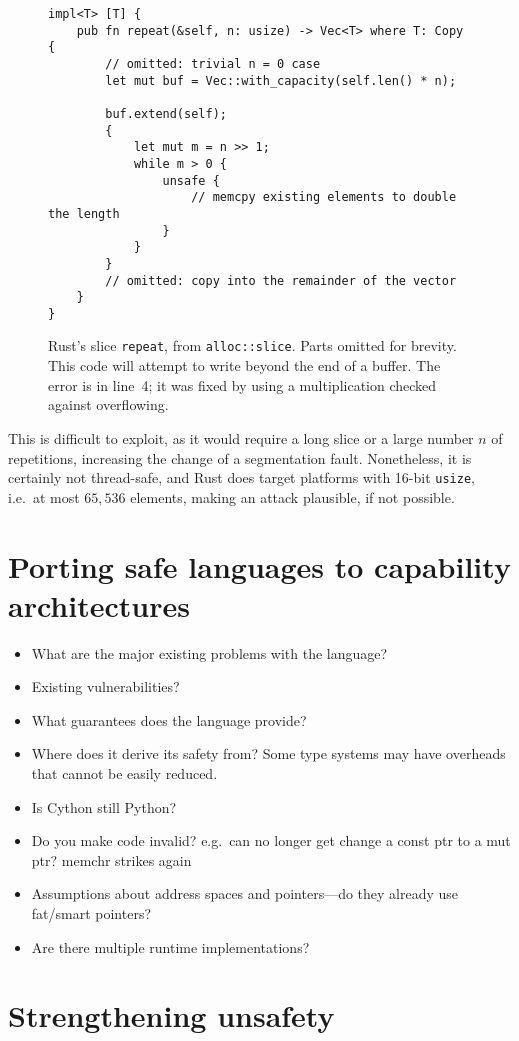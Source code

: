 \documentclass[dissertation.tex]{subfiles}
\begin{document}
\begin{figure}[ht]
\begin{lstlisting}
impl<T> [T] {
    pub fn repeat(&self, n: usize) -> Vec<T> where T: Copy {
        // omitted: trivial n = 0 case
        let mut buf = Vec::with_capacity(self.len() * n);

        buf.extend(self);
        {
            let mut m = n >> 1;
            while m > 0 {
                unsafe {
                    // memcpy existing elements to double the length
                }
            }
        }
        // omitted: copy into the remainder of the vector
    }
}
\end{lstlisting}
\caption{ Rust's slice \texttt{repeat}, from
\texttt{alloc::slice}. Parts omitted for brevity. This code will attempt
to write beyond the end of a buffer.
The error is in line~4; it was fixed by using a multiplication checked
against overflowing.}
\label{lst:slice-repeat}
\end{figure}


This is difficult to exploit, as it would require a long slice or a
large number \(n\) of repetitions, increasing the change of a
segmentation fault.
Nonetheless, it is certainly not thread-safe, and Rust does target
platforms with 16-bit \texttt{usize}, i.e.\ at most \(65,536\) elements,
making an attack plausible, if not possible.


\section{Porting safe languages to capability architectures}
\label{sec:eval-othersafe}

\begin{itemize}
    \item What are the major existing problems with the language?
    \item Existing vulnerabilities?
    \item What guarantees does the language provide?
    \item Where does it derive its safety from? Some type systems may
    have overheads that cannot be easily reduced.
    \item Is Cython still Python?
    \item Do you make code invalid? e.g.\ can no longer get change a
    const ptr to a mut ptr? memchr strikes again
    \item Assumptions about address spaces and pointers---do they
    already use fat/smart pointers?
    \item Are there multiple runtime implementations?
\end{itemize}


\section{Strengthening unsafety}
\label{sec:eval-betterunsafe}

\end{document}
